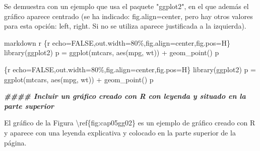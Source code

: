 \documentclass[11pt,a4paper,oneside,]{article}
\newenvironment{Shaded}{\begin{snugshade}}{\end{snugshade}}
\newcommand{\AttributeTok}[1]{\textcolor[rgb]{0.77,0.63,0.00}{#1}}
\newcommand{\DocumentationTok}[1]{\textcolor[rgb]{0.56,0.35,0.01}{\textbf{\textit{#1}}}}
\newcommand{\FunctionTok}[1]{\textcolor[rgb]{0.00,0.00,0.00}{#1}}
\newcommand{\NormalTok}[1]{#1}
\newcommand{\SpecialCharTok}[1]{\textcolor[rgb]{0.00,0.00,0.00}{#1}}
\newcommand{\StringTok}[1]{\textcolor[rgb]{0.31,0.60,0.02}{#1}}
\numberwithin{dummy}{section}
\theoremstyle{ocrenumbox}
\theoremstyle{blacknumex}
\theoremstyle{blacknumbox}
\theoremstyle{ocrenum}
\theoremstyle{ocrenum}
\begin{document}
\begin{Shaded}
\begin{Highlighting}[numbers=left,,]
\NormalTok{Se demuestra con un ejemplo que usa el paquete }\StringTok{"ggplot2"}\NormalTok{, en el que además el gráfico aparece }\FunctionTok{centrado}\NormalTok{ (se ha indicado}\SpecialCharTok{:} \StringTok{\textasciigrave{}}\AttributeTok{fig.align=\textquotesingle{}center\textquotesingle{}}\StringTok{\textasciigrave{}}\NormalTok{, pero hay otros valores para esta opción}\SpecialCharTok{:} \StringTok{\textasciigrave{}}\AttributeTok{\textquotesingle{}left\textquotesingle{}}\StringTok{\textasciigrave{}}\NormalTok{, }\StringTok{\textasciigrave{}}\AttributeTok{\textquotesingle{}right\textquotesingle{}}\StringTok{\textasciigrave{}}\NormalTok{. Si no se utiliza aparece justificada a la izquierda).}

\StringTok{\textasciigrave{}\textasciigrave{}\textasciigrave{}\textasciigrave{}}\NormalTok{markdown}
\StringTok{\textasciigrave{}}\AttributeTok{r \textquotesingle{}\textquotesingle{}}\StringTok{\textasciigrave{}\textasciigrave{}\textasciigrave{}\textasciigrave{}}\AttributeTok{\{r echo=FALSE,out.width=\textquotesingle{}80\%\textquotesingle{},fig.align=\textquotesingle{}center\textquotesingle{},fig.pos=\textquotesingle{}H\textquotesingle{}\}}
\AttributeTok{library(ggplot2)}
\AttributeTok{p = ggplot(mtcars, aes(mpg, wt)) + }
\AttributeTok{  geom\_point()}
\AttributeTok{p  }
\StringTok{\textasciigrave{}\textasciigrave{}\textasciigrave{}}
\StringTok{\textasciigrave{}\textasciigrave{}\textasciigrave{}\textasciigrave{}}

\StringTok{\textasciigrave{}\textasciigrave{}\textasciigrave{}}\AttributeTok{\{r echo=FALSE,out.width=\textquotesingle{}80\%\textquotesingle{},fig.align=\textquotesingle{}center\textquotesingle{},fig.pos=\textquotesingle{}H\textquotesingle{}\}}
\AttributeTok{library(ggplot2)}
\AttributeTok{p = ggplot(mtcars, aes(mpg, wt)) + }
\AttributeTok{  geom\_point()}
\AttributeTok{p}
\StringTok{\textasciigrave{}\textasciigrave{}\textasciigrave{}}




\DocumentationTok{\#\#\#\# Incluir un gráfico creado con R con leyenda y situado en la parte superior}

\NormalTok{El gráfico de la Figura \textbackslash{}ref\{fig}\SpecialCharTok{:}\NormalTok{cap05gg02\} es un ejemplo de gráfico creado con R y aparece con una leyenda explicativa y colocado en la parte superior de la página.}


\end{Highlighting}
\end{Shaded}
\end{document}
